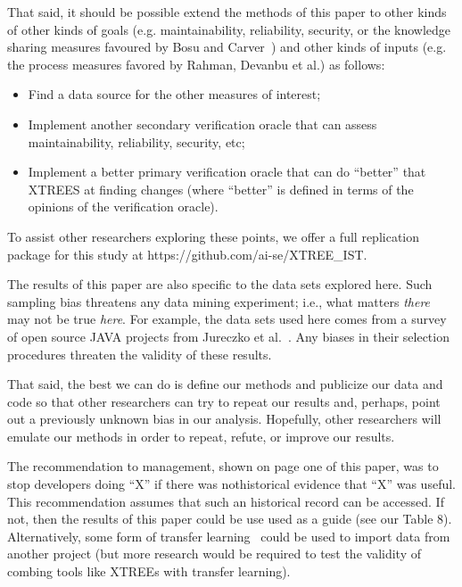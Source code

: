 \documentclass[twocolumn,5p]{elsarticle}
\newcommand{\bi}{\begin{itemize}[leftmargin=0.4cm]}
\newcommand{\ei}{\end{itemize}}
\theoremstyle{break}
\begin{document}
  That said, it should be possible extend the methods of this paper to  other kinds of other kinds of goals (e.g. maintainability, reliability, security,
  or the knowledge sharing measures favoured by Bosu and Carver~\cite{bosu13}) and other kinds of inputs (e.g. the process measures favored by Rahman, Devanbu et al.\cite{Rahman2013})  as follows:
  \bi
  \item Find a data source for the other measures of interest;
  \item Implement another secondary verification oracle that can assess maintainability, reliability, security, etc;
\item Implement a better primary verification oracle that can do ``better'' that XTREES at finding changes (where ``better'' is defined in terms 
of the opinions of the verification oracle).
\ei
To assist other researchers exploring these points, we offer a full replication package for this study at  https://github.com/ai-se/XTREE\_IST.

The results of this paper are also specific to the data sets explored here.
Such sampling bias threatens any data mining experiment; i.e., what matters
{\em there} may not be true {\em here}. For example, the data sets used here comes from a survey of
open source JAVA projects from Jureczko et al.~\cite{jureczko10}. Any biases in their selection procedures
threaten the validity of these results. 

That said,
the best we can do is define our methods and publicize our data and code so that other researchers can
try to repeat our results and, perhaps, point out a previously unknown bias
in our analysis. Hopefully, other researchers will emulate our methods in
order to repeat, refute, or improve our results. 

The recommendation to management, shown on page one of this paper,  was to stop developers doing ``X'' if there was
nothistorical evidence that ``X'' was useful. 
This recommendation assumes that such an  historical record can be accessed. If not,  then the results of this paper could be use used as a guide (see our Table 8). Alternatively, some form of transfer learning~\cite{Nam15,Jing15,krishna16} could be used to import data from another project (but more research would be required to test the validity of combing tools like XTREEs with transfer learning). 
  

  
  
\end{document}
